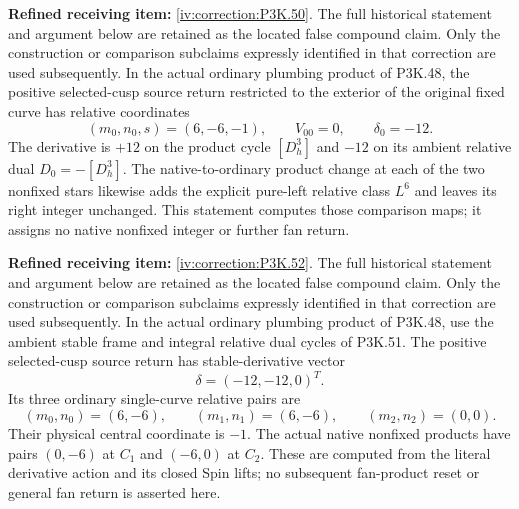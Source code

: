 \begin{theorem}\hypertarget{tag-02UW}{}\label{night:P3K.50}

\par\noindent\textbf{Refined receiving item:} \cref{iv:correction:P3K.50}. The full historical statement and argument below are retained as the located false compound claim. Only the construction or comparison subclaims expressly identified in that correction are used subsequently.
In the actual ordinary plumbing product of P3K.48, the positive
selected-cusp source return restricted to the exterior of the
original fixed curve has relative coordinates
\[
 (m_0,n_0,s)=(6,-6,-1),\qquad V_{00}=0,\qquad\delta_0=-12.
\]
The derivative is \(+12\) on the product cycle \([D^3_h]\) and
\(-12\) on its ambient relative dual \(D_0=-[D^3_h]\).
The native-to-ordinary product change at each of the two nonfixed
stars likewise adds the explicit pure-left relative class \(L^6\)
and leaves its right integer unchanged. This statement computes
those comparison maps; it assigns no native nonfixed integer or
further fan return.
\end{theorem}

\begin{theorem}\hypertarget{tag-02UY}{}\label{night:P3K.52}

\par\noindent\textbf{Refined receiving item:} \cref{iv:correction:P3K.52}. The full historical statement and argument below are retained as the located false compound claim. Only the construction or comparison subclaims expressly identified in that correction are used subsequently.
In the actual ordinary plumbing product of P3K.48, use the ambient
stable frame and integral relative dual cycles of P3K.51. The
positive selected-cusp source return has stable-derivative vector
\[
 \delta=(-12,-12,0)^T.
\]
Its three ordinary single-curve relative pairs are
\[
 (m_0,n_0)=(6,-6),\qquad(m_1,n_1)=(6,-6),\qquad
 (m_2,n_2)=(0,0).
\]
Their physical central coordinate is $-1$. The actual native nonfixed products
have pairs \((0,-6)\) at \(C_1\) and \((-6,0)\) at \(C_2\).
These are computed from the literal derivative action and its
closed Spin lifts; no subsequent fan-product reset or general fan
return is asserted here.
\end{theorem}

